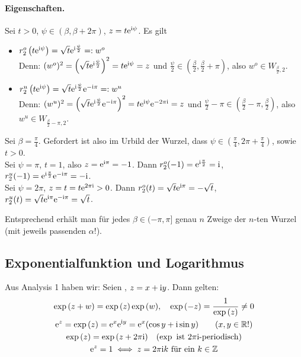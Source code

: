 \documentclass[a4paper,twoside,DIV15,BCOR12mm]{scrbook}
\begin{document}
\paragraph{Eigenschaften.} Sei $t>0$, $\psi\in(\beta,\beta+2\pi)$, $z=t\mathrm{e}^{\mathrm{i}\psi}$. Es gilt
\begin{itemize}
\item $r_2^o\left(t\mathrm{e}^{\mathrm{i}\psi}\right) = \sqrt{t}\mathrm{e}^{\mathrm{i}\frac\psi2} =: w^o$\\
  Denn: $(w^o)^2 = \left(\sqrt{t}\mathrm{e}^{\mathrm{i}\frac\psi2}\right)^2 = t\mathrm{e}^{\mathrm{i}\psi} = z$ und $\frac\psi2 \in
  (\frac\beta2,\frac\beta2+\pi)$, also $w^o\in W_{\frac\beta2,2}$.
\item $r_2^u\left(t\mathrm{e}^{\mathrm{i}\psi}\right) = \sqrt{t}\mathrm{e}^{\mathrm{i}\frac\psi2}\mathrm{e}^{-\mathrm{i}\pi} =: w^u$\\
  Denn: $(w^u)^2 = \left(\sqrt{t}\mathrm{e}^{\mathrm{i}\frac\psi2}\mathrm{e}^{-\mathrm{i}\pi}\right)^2 = t\mathrm{e}^{\mathrm{i}\psi}\mathrm{e}^{-2\pi\mathrm{i}} = z$ und $\frac\psi2-\pi \in
  (\frac\beta2-\pi,\frac\beta2)$, also $w^u\in W_{\frac\beta2-\pi,2}$.
\end{itemize}

\begin{bsp*}
  Sei $\beta=\frac\pi4$. Gefordert ist also im Urbild der Wurzel, dass $\psi\in(\frac\pi4,2\pi+\frac\pi4)$, sowie $t>0$.\\
  Sei $\psi=\pi$, $t=1$, also $z=\mathrm{e}^{\mathrm{i}\pi}=-1$. Dann $r^o_2(-1)=\mathrm{e}^{\mathrm{i}\frac\pi2}=\mathrm{i}$,
  $r^u_2(-1)=\mathrm{e}^{\mathrm{i}\frac\pi2}\mathrm{e}^{-\mathrm{i}\pi}=-\mathrm{i}$. \\
  Sei $\psi=2\pi$, $z=t=t\mathrm{e}^{2\pi\mathrm{i}}>0$. Dann $r^o_2(t) = \sqrt{t}\mathrm{e}^{\mathrm{i}\pi} = -\sqrt{t}$, $r^u_2(t) =
  \sqrt{t}\mathrm{e}^{\mathrm{i}\pi}\mathrm{e}^{-\mathrm{i}\pi} = \sqrt{t}$.
\end{bsp*}

\noindent Entsprechend erhält man für jedes $\beta\in(-\pi,\pi]$ genau $n$ Zweige der $n$-ten Wurzel (mit jeweils passenden $\alpha$!).


\subsection{Exponentialfunktion und Logarithmus}

Aus Analysis 1 haben wir: Seien , $z=x+\mathrm{i} y$. Dann gelten:
\begin{gather}
  \exp{(z+w)}=\exp{(z)}\exp{(w)}, \quad \exp{(-z)} = \frac{1}{\exp{(z)}} \neq 0 \label{1.6} \\
  \mathrm{e}^z = \exp{(z)} = \mathrm{e}^x\mathrm{e}^{\mathrm{i} y} = \mathrm{e}^x(\cos{y}+\mathrm{i}\sin{y}) \quad \quad (x,y\in\mathbb{R}!) \label{1.7} \\
  \exp{(z)} = \exp{(z+2\pi\mathrm{i})} \quad (\exp \text{ ist } 2\pi\mathrm{i}\text{-periodisch}) \label{1.8} \\
  \mathrm{e}^z=1 \iff z=2\pi\mathrm{i} k \text{ für ein } k\in\mathbb{Z} \label{eqn1.9}
\end{gather}
\end{document}
